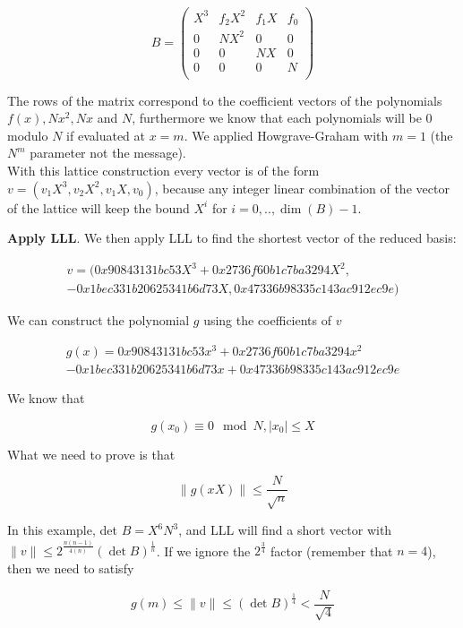 \documentclass[a4paper,12pt]{report}
\begin{document}
\[
B = 
\begin{pmatrix}
    X^3 & f_2X^2 & f_1X & f_0 \\
    0 & NX^2 & 0 & 0 \\
    0 & 0 & NX & 0 \\
    0 & 0 & 0 & N \\
\end{pmatrix}
\] 

The rows of the matrix correspond to the coefficient vectors of the polynomials $f(x), Nx^2, Nx$ and $N$, furthermore we know
that each polynomials will be 0 modulo $N$ if evaluated at $x = m$.
We applied Howgrave-Graham with $m=1$ (the $N^m$ parameter not the message).\\
With this lattice construction every vector is of the form $v = (v_1X^3, v_2X^2, v_1X, v_0)$, because any
integer linear combination of the vector of the lattice will keep the bound $X^i$ for $i=0,..,\dim(B)-1$.

\textbf{Apply LLL}. We then apply LLL to find the shortest vector of the reduced basis:

\[
    \begin{split}
    v = (0x90843131bc53X^3 + 0x2736f60b1c7ba3294X^2, \\
    -0x1bec331b20625341b6d73X, 0x47336b98335c143ac912ec9e)
    \end{split}
\]

We can construct the polynomial $g$ using the coefficients of $v$

\[
    \begin{split}
        g(x) = 0x90843131bc53x^3 + 0x2736f60b1c7ba3294x^2 \\
        -0x1bec331b20625341b6d73x + 0x47336b98335c143ac912ec9e
    \end{split}
\]

We know that

\[
    g(x_0) \equiv 0 \mod N, |x_0| \le X
\]

What we need to prove is that

\[
    \lVert g(xX) \rVert \le \frac{N}{\sqrt{n}}
\] 

In this example, det $B = X^6N^3$, and LLL will find a short vector with $\lVert v \rVert \le 2^{\frac{n(n-1)}{4(n)}} (\det B)^{\frac{1}{n}}$.
If we ignore the $2^{\frac{3}{4}}$ factor (remember that $n = 4$), then we need to satisfy

\[
    g(m) \le \lVert v \rVert \le (\det B)^{\frac{1}{4}} < \frac{N}{\sqrt{4}}
\] 

\vspace*{10px}
\end{document}
